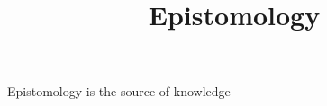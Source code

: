 \documentclass[a4paper]{article}
\title{Epistomology}
\date{}
\begin{document}
    \maketitle
    Epistomology is the source of knowledge
\end{document}
